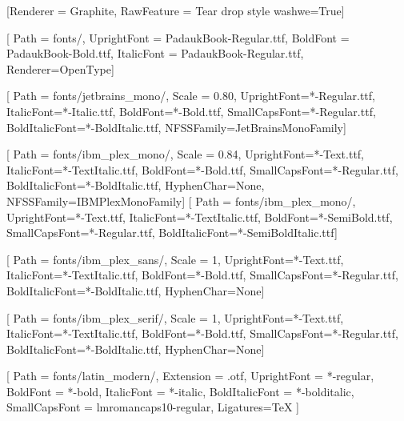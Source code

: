 \setmainfont[
    Path = fonts/,
    UprightFont = PadaukBook-Regular.ttf,
    BoldFont = PadaukBook-Bold.ttf,
    ItalicFont = PadaukBook-Regular.ttf,    
]{Padauk Book}
[Renderer = Graphite, RawFeature = {Tear drop style washwe=True}]

[
    Path = fonts/,
    UprightFont = PadaukBook-Regular.ttf,
    BoldFont = PadaukBook-Bold.ttf,
    ItalicFont = PadaukBook-Regular.ttf,
    Renderer=OpenType]
\DeclareTextFontCommand{\textpadauk}{\padaukfamily}

[
    Path = fonts/jetbrains_mono/,
    Scale = 0.80,
    UprightFont=*-Regular.ttf,
    ItalicFont=*-Italic.ttf,
    BoldFont=*-Bold.ttf,
    SmallCapsFont=*-Regular.ttf,
    BoldItalicFont=*-BoldItalic.ttf,
    NFSSFamily=JetBrainsMonoFamily]
\DeclareTextFontCommand{\textjetbrainsmono}{\jetbrainsmonofamily}

[
    Path = fonts/ibm_plex_mono/,
    Scale = 0.84,
    UprightFont=*-Text.ttf,
    ItalicFont=*-TextItalic.ttf,
    BoldFont=*-Bold.ttf,
    SmallCapsFont=*-Regular.ttf,
    BoldItalicFont=*-BoldItalic.ttf,
    HyphenChar=None,
    NFSSFamily=IBMPlexMonoFamily]
\DeclareTextFontCommand{\textibmplexmono}{\ibmplexmonofamily}
[
    Path = fonts/ibm_plex_mono/,
    UprightFont=*-Text.ttf,
    ItalicFont=*-TextItalic.ttf,
    BoldFont=*-SemiBold.ttf,
    SmallCapsFont=*-Regular.ttf,
    BoldItalicFont=*-SemiBoldItalic.ttf]
\DeclareTextFontCommand{\textibmplexmonoa}{\ibmplexmonofamilya}

[
    Path = fonts/ibm_plex_sans/,
    Scale = 1,
    UprightFont=*-Text.ttf,
    ItalicFont=*-TextItalic.ttf,
    BoldFont=*-Bold.ttf,
    SmallCapsFont=*-Regular.ttf,
    BoldItalicFont=*-BoldItalic.ttf,
    HyphenChar=None]
\DeclareTextFontCommand{\textibmplexsans}{\ibmplexsansfamily}

[
    Path = fonts/ibm_plex_serif/,
    Scale = 1,
    UprightFont=*-Text.ttf,
    ItalicFont=*-TextItalic.ttf,
    BoldFont=*-Bold.ttf,
    SmallCapsFont=*-Regular.ttf,
    BoldItalicFont=*-BoldItalic.ttf,
    HyphenChar=None]
\DeclareTextFontCommand{\textibmplexserif}{\ibmplexseriffamily}

%
[
    Path = fonts/latin_modern/,
    Extension = .otf,
    UprightFont = *-regular, 
    BoldFont = *-bold,
    ItalicFont = *-italic,
    BoldItalicFont = *-bolditalic,
    SmallCapsFont = lmromancaps10-regular,
    Ligatures=TeX
]
\DeclareTextFontCommand{\textlatinmodern}{\latinmodernfamily}

